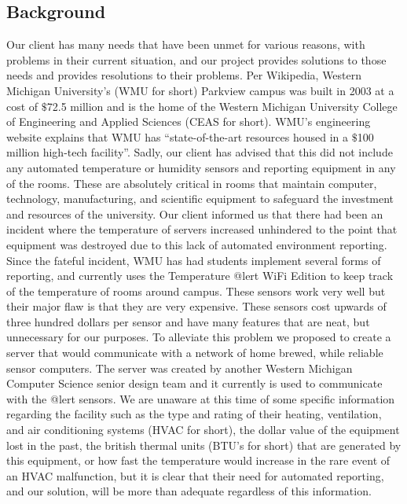 \documentclass{report}
\begin{document}
\subsection*{Background}
Our client has many needs that have been unmet for various reasons, with problems in their current situation, and our project provides solutions to those needs and provides resolutions to their problems.
\newline
\indent
Per Wikipedia, Western Michigan University's (WMU for short) Parkview campus was built in 2003 at a cost of $\$$72.5 million and is the home of the Western Michigan University College of Engineering and Applied Sciences (CEAS for short). 
 WMU’s engineering website explains that WMU has “state-of-the-art resources housed in a $\$$100 million high-tech facility”. 
Sadly, our client has advised that this did not include any automated temperature or humidity sensors and reporting equipment in any of the rooms. 
 These are absolutely critical in rooms that maintain computer, technology, manufacturing, and scientific equipment to safeguard the investment and resources of the university.
 Our client informed us that there had been an incident where the temperature of servers increased unhindered to the point that equipment was destroyed due to this lack of automated environment reporting.
Since the fateful incident, WMU has had students implement several forms of reporting, and currently uses the Temperature @lert WiFi Edition to keep track of the temperature of rooms around campus. 
These sensors work very well but their major flaw is that they are very expensive. These sensors cost upwards of three hundred dollars per sensor and have many features that are neat, but unnecessary for our purposes. 
To alleviate this problem we proposed to create a server that would communicate with a network of home brewed, while reliable sensor computers. 
The server was created by another Western Michigan Computer Science senior design team and it currently is used to communicate with the @lert sensors.
\newline
\indent  
We are unaware at this time of some specific information regarding the facility such as the type and rating of their heating, ventilation, and air conditioning systems (HVAC for short), the dollar value of the equipment lost in the past, the british thermal units (BTU’s for short) that are generated by this equipment, or how fast the temperature would increase in the rare event of an HVAC malfunction, but it is clear that their need for automated reporting, and our solution, will be more than adequate regardless of this information. 
\end{document}
